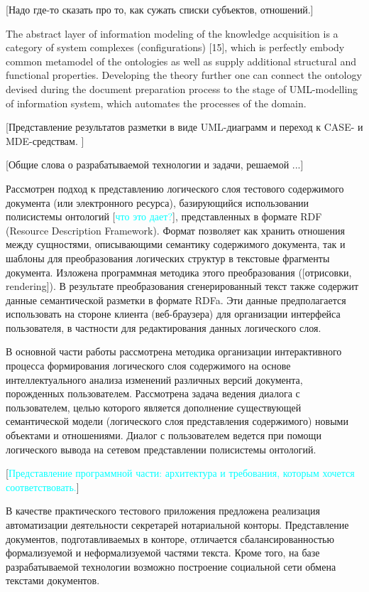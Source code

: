\documentclass[utf8]{../IncArticle}
\newcommand{\e}[2][fcolor]{\textcolor{pcolor}{[}\textcolor{#1}{#2}\textcolor{pcolor}{]}}
\begin{document}
\e{Надо где-то сказать про то, как сужать списки субъектов, отношений.}

The abstract layer of information modeling of the knowledge
acquisition is a category of system complexes (configurations) [15],
which is perfectly embody common metamodel of the ontologies as well
as supply additional structural and functional properties. Developing
the theory further one can connect the ontology devised during the
document preparation process to the stage of UML-modelling of
information system, which automates the processes of the domain.

\e{Представление результатов разметки в виде UML-диаграмм и переход к
  CASE- и MDE-средствам. }

\conclusion

\e{Общие слова о разрабатываемой технологии и задачи, решаемой ...}

Рассмотрен подход к представлению логического слоя тестового
содержимого документа (или электронного ресурса), базирующийся
использовании полисистемы онтологий \e[cyan]{что это дает?}, представленных в формате RDF
(Resource Description Framework).  Формат позволяет как хранить
отношения между сущностями, описывающими семантику содержимого
документа, так и шаблоны для преобразования логических структур в
текстовые фрагменты документа.  Изложена программная методика этого преобразования
(\e{отрисовки, rendering}).  В результате преобразования
сгенерированный текст также содержит данные семантической разметки в
формате RDFa.  Эти данные предполагается использовать на стороне
клиента (веб-браузера) для организации интерфейса пользователя, в
частности для редактирования данных логического слоя.

В основной части работы рассмотрена методика организации интерактивного
процесса формирования логического слоя содержимого на основе
интеллектуального анализа изменений различных версий документа,
порожденных пользователем.  Рассмотрена задача ведения диалога с
пользователем, целью которого является дополнение существующей
семантической модели (логического слоя представления содержимого)
новыми объектами и отношениями.  Диалог с пользователем ведется при
помощи логического вывода на сетевом представлении полисистемы онтологий.

\e[cyan]{Представление программной части: архитектура и требования,
  которым хочется соответствовать.}

В качестве практического тестового приложения предложена реализация
автоматизации деятельности секретарей нотариальной конторы.
Представление документов, подготавливаемых в конторе, отличается
сбалансированностью формализуемой и неформализуемой частями текста.
Кроме того, на базе разрабатываемой технологии возможно построение
социальной сети обмена текстами документов.
\end{document}

